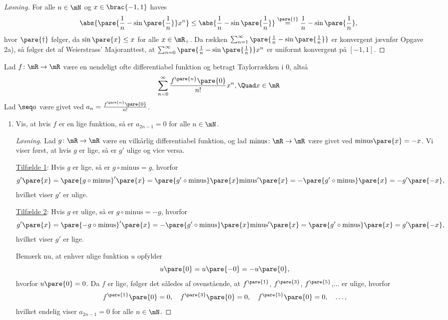 \begin{opg}
\begin{enumerate}
\begin{proof}[Løsning]
    For alle $n\in\mN$ og $x\in\brac{-1,1}$ haves
    $$ \abs{\pare{\frac{1}{n}-\sin\pare{\frac{1}{n}}}x^n}
        \leq \abs{\frac{1}{n}-\sin\pare{\frac{1}{n}}}
        \overset{\pare{\dagger}}{=} \frac{1}{n}-\sin\pare{\frac{1}{n}}, $$
    hvor $\pare{\dagger}$ følger, da $\sin\pare{x} \leq x$ for alle $x\in\mR_+$. Da rækken $\sum_{n=1}^\infty \pare{\frac{1}{n}-\sin\pare{\frac{1}{n}}}$ er konvergent jævnfør Opgave 2a), så følger det af Weierstrass' Majoranttest, at $\sum_{n=0}^\infty \pare{\frac{1}{n}-\sin\pare{\frac{1}{n}}}x^n$ er uniformt konvergent på $[-1,1]$.
    \end{proof}
    
\end{enumerate}
\end{opg}

\begin{opg}
Lad $f\colon\mR\to\mR$ være en uendeligt ofte differentiabel funktion og betragt Taylorrækken i $0$, altså
$$ \sum_{n=0}^\infty \frac{f^{\pare{n}}\pare{0}}{n!}x^n, \Quad x\in\mR $$
Lad $\seq a$ være givet ved $a_n = \frac{f^{\pare{n}}\pare{0}}{n!}$.
\begin{enumerate}
    \item Vis, at hvis $f$ er en lige funktion, så er $a_{2n-1}=0$ for alle $n\in\mN$.
    
    \begin{proof}[Løsning]
    Lad $g\colon\mR\to\mR$ være en vilkårlig differentiabel funktion, og lad $\text{minus}\colon\mR\to\mR$ være givet ved $\text{minus}\pare{x} = -x$. Vi viser først, at hvis $g$ er lige, så er $g'$ ulige og vice versa. 
    \begin{indent}
    \underline{Tilfælde 1}: Hvis $g$ er lige, så er $g\circ\text{minus} = g$, hvorfor
    $$ g'\pare{x} = \pare{g\circ\text{minus}}'\pare{x}
        = \pare{g'\circ\text{minus}}\pare{x}\text{minus}'\pare{x}
        = -\pare{g'\circ\text{minus}}\pare{x}
        = -g'\pare{-x}, $$
    hvilket viser $g'$ er ulige.

    \underline{Tilfælde 2}: Hvis $g$ er ulige, så er $g\circ\text{minus} = -g$, hvorfor
    $$ g'\pare{x} = \pare{-g\circ\text{minus}}'\pare{x}
        = -\pare{g'\circ\text{minus}}\pare{x}\text{minus}'\pare{x}
        = \pare{g'\circ\text{minus}}\pare{x}
        = g'\pare{-x}, $$
    hvilket viser $g'$ er lige.
    \end{indent}
    Bemærk nu, at enhver ulige funktion $u$ opfylder
    $$ u\pare{0} = u\pare{-0} = -u\pare{0}, $$
    hvorfor $u\pare{0} = 0$. Da $f$ er lige, følger det således af ovenstående, at $f^{\pare{1}}$, $f^{\pare{3}}$, $f^{\pare{5}}$,$\ldots$ er ulige, hvorfor 
    $$ f^{\pare{1}}\pare{0} = 0, \quad f^{\pare{3}}\pare{0} = 0, \quad f^{\pare{5}}\pare{0} = 0, \quad \ldots, $$
    hvilket endelig viser $a_{2n-1} = 0$ for alle $n\in\mN$. 
    \end{proof}
    

\end{enumerate}
\end{opg}
